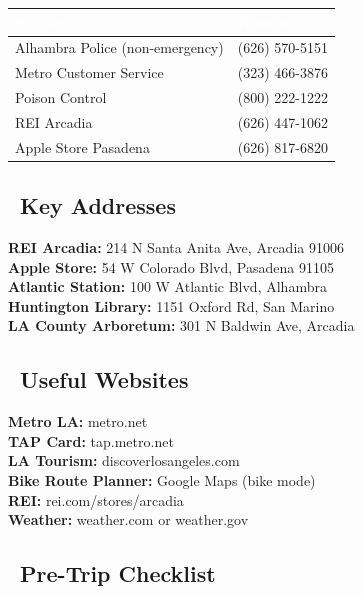 \documentclass[10pt,letterpaper]{article}
\begin{document}
\begin{small}
\begin{tabularx}{\textwidth}{|X|l|}
\hline
\rowcolor{primary!80}\textcolor{white}{\textbf{Service}} & \textcolor{white}{\textbf{Number}} \\
\hline
Alhambra Police (non-emergency) & (626) 570-5151 \\
\hline
Metro Customer Service & (323) 466-3876 \\
\hline
Poison Control & (800) 222-1222 \\
\hline
REI Arcadia & (626) 447-1062 \\
\hline
Apple Store Pasadena & (626) 817-6820 \\
\hline
\end{tabularx}
\end{small}

\subsection*{\faMapMarked\ Key Addresses}

\begin{small}
\textbf{REI Arcadia:} 214 N Santa Anita Ave, Arcadia 91006\\
\textbf{Apple Store:} 54 W Colorado Blvd, Pasadena 91105\\
\textbf{Atlantic Station:} 100 W Atlantic Blvd, Alhambra\\
\textbf{Huntington Library:} 1151 Oxford Rd, San Marino\\
\textbf{LA County Arboretum:} 301 N Baldwin Ave, Arcadia
\end{small}

\subsection*{\faLink\ Useful Websites}

\begin{small}
\textbf{Metro LA:} metro.net\\
\textbf{TAP Card:} tap.metro.net\\
\textbf{LA Tourism:} discoverlosangeles.com\\
\textbf{Bike Route Planner:} Google Maps (bike mode)\\
\textbf{REI:} rei.com/stores/arcadia\\
\textbf{Weather:} weather.com or weather.gov
\end{small}

\subsection*{\faCheckSquare\ Pre-Trip Checklist}
\end{document}
